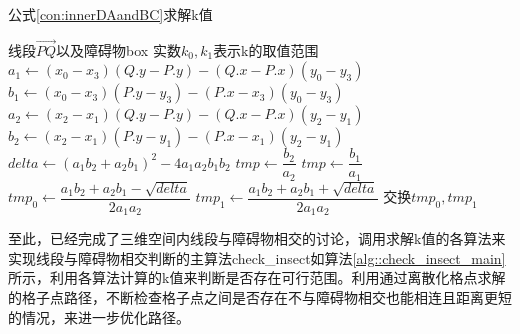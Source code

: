 \begin{algorithm}[!htb]
    \caption{公式\ref{con:innerDAandBC}求解k值}
    \label{alg::check_insect_secondcross}
    \begin{algorithmic}[1]
        \Require 线段$\vec{PQ}$以及障碍物box
        \Ensure 实数$k_0,k_1$表示k的取值范围
            \State $a_1 \gets (x_0-x_3)(Q.y-P.y)-(Q.x-P.x)(y_0-y_3)$
            \State $b_1 \gets (x_0-x_3)(P.y-y_3)-(P.x-x_3)(y_0-y_3)$
            \State $a_2 \gets (x_2-x_1)(Q.y-P.y)-(Q.x-P.x)(y_2-y_1)$
            \State $b_2 \gets (x_2-x_1)(P.y-y_1)-(P.x-x_1)(y_2-y_1)$
            \State $delta \gets (a_1b_2+a_2b_1)^2-4a_1a_2b_1b_2$
                \State {}
            \EndIf
                    \State {}
                \EndIf
                \State $tmp \gets \dfrac{b_2}{a_2}$
                    \State {}
                \EndIf
                \State $tmp \gets \dfrac{b_1}{a_1}$
                    \State {}
                \EndIf
            \Else
                \State $tmp_0 \gets \dfrac{a_1b_2+a_2b_1-\sqrt{delta}}{2a_1a_2}$
                \State $tmp_1 \gets \dfrac{a_1b_2+a_2b_1+\sqrt{delta}}{2a_1a_2}$
                    \State 交换$tmp_0,tmp_1$
                \EndIf
                \State {}
            \EndIf
        \EndFunction
    \end{algorithmic}
\end{algorithm}
\par 至此，已经完成了三维空间内线段与障碍物相交的讨论，调用求解k值的各算法来实现线段与障碍物相交判断的主算法check\_insect如算法\ref{alg::check_insect_main}所示，利用各算法计算的k值来判断是否存在可行范围。利用通过离散化格点求解的格子点路径，不断检查格子点之间是否存在不与障碍物相交也能相连且距离更短的情况，来进一步优化路径。
